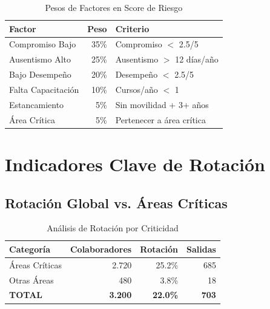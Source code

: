 \documentclass[11pt,a4paper,twoside]{article}
\begin{document}
\begin{table}[H]
    \centering
    \caption{Pesos de Factores en Score de Riesgo}
    \begin{tabular}{|l|r|l|}
        \toprule
        \textbf{Factor} & \textbf{Peso} & \textbf{Criterio} \\
        \midrule
        Compromiso Bajo & 35\% & Compromiso $<$ 2.5/5 \\
        Ausentismo Alto & 25\% & Ausentismo $>$ 12 días/año \\
        Bajo Desempeño & 20\% & Desempeño $<$ 2.5/5 \\
        Falta Capacitación & 10\% & Cursos/año $<$ 1 \\
        Estancamiento & 5\% & Sin movilidad + 3+ años \\
        Área Crítica & 5\% & Pertenecer a área crítica \\
        \bottomrule
    \end{tabular}
\end{table}

\newpage

\section{Indicadores Clave de Rotación}

\subsection{Rotación Global vs. Áreas Críticas}

\begin{table}[H]
    \centering
    \caption{Análisis de Rotación por Criticidad}
    \begin{tabular}{|l|r|r|r|}
        \toprule
        \textbf{Categoría} & \textbf{Colaboradores} & \textbf{Rotación} & \textbf{Salidas} \\
        \midrule
        Áreas Críticas & 2.720 & 25.2\% & 685 \\
        Otras Áreas & 480 & 3.8\% & 18 \\
        \midrule
        \textbf{TOTAL} & \textbf{3.200} & \textbf{22.0\%} & \textbf{703} \\
        \bottomrule
    \end{tabular}
\end{table}
\end{document}
